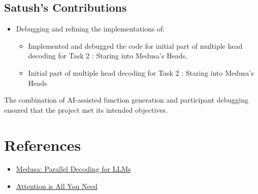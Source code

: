 \documentclass{article}
\begin{document}
\subsection{Satush's Contributions}
\begin{itemize}
    \item Debugging and refining the implementations of:
    \begin{itemize}
    \item Implemented and debugged the code for initial part of multiple head decoding for Task 2 : Staring into Medusa's Heads.
    \item Initial part of multiple head decoding for Task 2 : Staring into Medusa's Heads
    \end{itemize}
\end{itemize}

The combination of AI-assisted function generation and participant debugging ensured that the project met its intended objectives.
\section{References}

\begin{itemize}
    \item \href{https://sites.google.com/view/medusa-llm}{Medusa: Parallel Decoding for LLMs}
    \item \href{https://huggingface.co/blog/constrained-beam-search}{Attention is All You Need}
\end{itemize}
\end{document}

